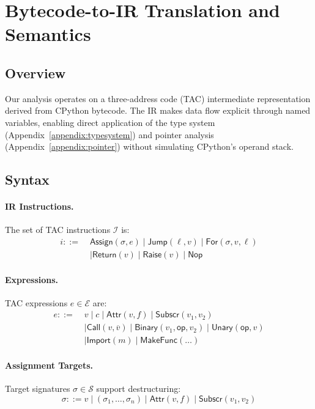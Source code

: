 \section{Bytecode-to-IR Translation and Semantics}
\label{appendix:ir}

\subsection{Overview}
Our analysis operates on a three-address code (TAC) intermediate representation derived from CPython bytecode. The IR makes data flow explicit through named variables, enabling direct application of the type system (Appendix~\ref{appendix:typesystem}) and pointer analysis (Appendix~\ref{appendix:pointer}) without simulating CPython's operand stack.

\subsection{Syntax}

\paragraph{IR Instructions.} The set of TAC instructions $\mathcal{I}$ is:
\[
\begin{aligned}
i ::= \;& \mathsf{Assign}(\sigma, e)
\mid \mathsf{Jump}(\ell, v)
\mid \mathsf{For}(\sigma, v, \ell) \\
&\mid \mathsf{Return}(v)
\mid \mathsf{Raise}(v)
\mid \mathsf{Nop}
\end{aligned}
\]

\paragraph{Expressions.} TAC expressions $e \in \mathcal{E}$ are:
\[
\begin{aligned}
e ::= \;& v \mid c
\mid \mathsf{Attr}(v, f)
\mid \mathsf{Subscr}(v_1, v_2) \\
&\mid \mathsf{Call}(v, \overline{v})
\mid \mathsf{Binary}(v_1, \mathsf{op}, v_2)
\mid \mathsf{Unary}(\mathsf{op}, v) \\
&\mid \mathsf{Import}(m)
\mid \mathsf{MakeFunc}(\ldots)
\end{aligned}
\]

\paragraph{Assignment Targets.} Target signatures $\sigma \in \mathcal{S}$ support destructuring:
\[
\sigma ::= v \mid (\sigma_1, \ldots, \sigma_n) \mid \mathsf{Attr}(v, f) \mid \mathsf{Subscr}(v_1, v_2)
\]

